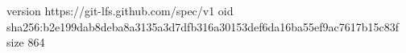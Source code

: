 version https://git-lfs.github.com/spec/v1
oid sha256:b2e199dab8deba8a3135a3d7dfb316a30153def6da16ba55ef9ac7617b15c83f
size 864
